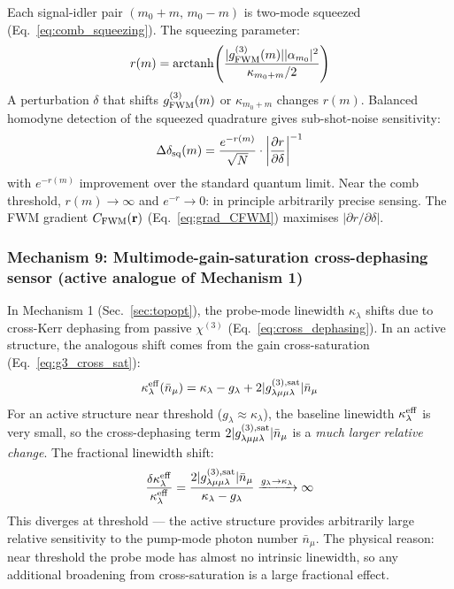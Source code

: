\documentclass[12pt]{article}
\begin{document}
Each signal-idler pair $(m_0+m,\,m_0-m)$ is two-mode squeezed
(Eq.~\ref{eq:comb_squeezing}).  The squeezing parameter:
\begin{equation}
  r(m) = \mathrm{arctanh}\!\left(
  \frac{|g^{(3)}_{\rm FWM}(m)||\alpha_{m_0}|^2}
  {\kappa_{m_0+m}/2}\right)
  \label{eq:squeezing_param}
\end{equation}
A perturbation $\delta$ that shifts $g^{(3)}_{\rm FWM}(m)$ or
$\kappa_{m_0+m}$ changes $r(m)$.  Balanced homodyne detection of the
squeezed quadrature gives sub-shot-noise sensitivity:
\begin{equation}
  \Delta\delta_{\rm sq}(m) =
  \frac{e^{-r(m)}}{\sqrt{N}}\cdot
  \left|\frac{\partial r}{\partial\delta}\right|^{-1}
  \label{eq:squeezed_delta}
\end{equation}
with $e^{-r(m)}$ improvement over the standard quantum limit.  Near the
comb threshold, $r(m)\to\infty$ and $e^{-r}\to 0$: in principle
arbitrarily precise sensing.  The FWM gradient $C_{\rm FWM}(\mathbf{r})$
(Eq.~\ref{eq:grad_CFWM}) maximises $|\partial r/\partial\delta|$.

\subsubsection*{Mechanism 9: Multimode-gain-saturation cross-dephasing sensor
(active analogue of Mechanism 1)}

In Mechanism 1 (Sec.~\ref{sec:topopt}), the probe-mode linewidth
$\kappa_\lambda$ shifts due to cross-Kerr dephasing from passive
$\chi^{(3)}$ (Eq.~\ref{eq:cross_dephasing}).  In an active structure,
the analogous shift comes from the gain cross-saturation
(Eq.~\ref{eq:g3_cross_sat}):
\begin{equation}
  \kappa_\lambda^{\rm eff}(\bar{n}_\mu) =
  \kappa_\lambda - g_\lambda
  + 2|g^{(3),\rm sat}_{\lambda\mu\mu\lambda}|\bar{n}_\mu
  \label{eq:active_cross_deph}
\end{equation}
For an active structure near threshold ($g_\lambda\approx\kappa_\lambda$),
the baseline linewidth $\kappa_\lambda^{\rm eff}$ is very small, so the
cross-dephasing term $2|g^{(3),\rm sat}_{\lambda\mu\mu\lambda}|\bar{n}_\mu$
is a \emph{much larger relative change}.  The fractional linewidth shift:
\begin{equation}
  \frac{\delta\kappa_\lambda^{\rm eff}}{\kappa_\lambda^{\rm eff}} =
  \frac{2|g^{(3),\rm sat}_{\lambda\mu\mu\lambda}|\bar{n}_\mu}
  {\kappa_\lambda - g_\lambda}
  \xrightarrow{g_\lambda\to\kappa_\lambda} \infty
  \label{eq:active_cross_frac}
\end{equation}
This diverges at threshold --- the active structure provides arbitrarily
large relative sensitivity to the pump-mode photon number $\bar{n}_\mu$.
The physical reason: near threshold the probe mode has almost no intrinsic
linewidth, so any additional broadening from cross-saturation is a large
fractional effect.
\end{document}
